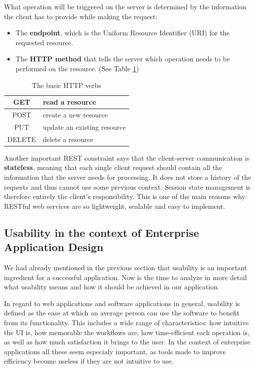 What operation will be triggered on the server is determined by the information the client has to provide while making the request:

\begin{itemize}
    \item The \textbf{endpoint}, which is the Uniform Resource Identifier (URI) for the requested resource.
    \item The \textbf{HTTP method} that tells the server which operation needs to be performed on the resource. (See Table \ref{httpVerbs})
\end{itemize}

\begin{table}[H]
    \centering
    \begin{tabular}{|c|l|}
        \hline
        GET    & read a resource             \\ \hline
        POST   & create a new resource       \\ \hline
        PUT    & update an existing resource \\ \hline
        DELETE & delete a resource           \\ \hline
    \end{tabular}
    \caption{The basic HTTP verbs}
    \label{httpVerbs}
\end{table}

Another important REST constraint says that the client-server communication is \textbf{stateless}, meaning that each single client request should contain all the information that the server needs for processing. It does not store a history of the requests and thus cannot use some previous context. Session state management is therefore entirely the client's responsibility. This is one of the main reasons why RESTful web services are so lightweight, scalable and easy to implement.


\subsection{Usability in the context of Enterprise Application Design}
\label{subsection:usability}

We had already mentioned in the previous section that usability is an important ingredient for a successful application. Now is the time to analyze in more detail what usability means and how it should be achieved in our application.

In regard to web applications and software applications in general, usability is defined as the ease at which an average person can use the software to benefit from its functionality. This includes a wide range of characteristics: how intuitive the UI is, how memorable the workflows are, how time-efficient each operation is, as well as how much satisfaction it brings to the user. In the context of enterprise applications all these seem especialy important, as tools made to improve efficiency become useless if they are not intuitive to use.

